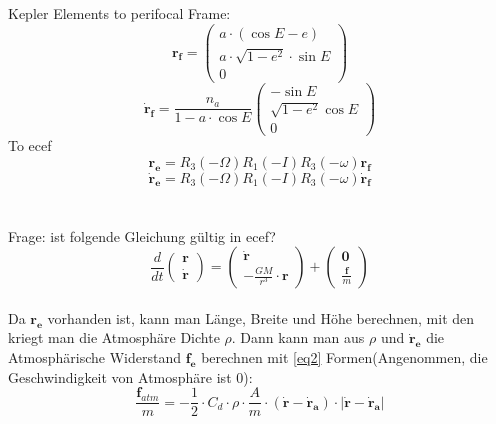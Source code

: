 \documentclass{article}
\begin{document}
\section{}
Kepler Elements to perifocal Frame: 
\begin{equation*}
	\bm{r_f} = \left(\begin{matrix}
		a \cdot \left(\cos E-e\right) \\
		a \cdot \sqrt{1-e^2} \cdot \sin E \\
		0
	\end{matrix}\right)
\end{equation*}
\begin{equation*}
	\bm{\dot{r}_f} = \frac{n_a}{1-a \cdot \cos E}\left(\begin{matrix}
		-\sin E \\
		\sqrt{1-e^2} \cos E \\
		0
	\end{matrix}\right)
\end{equation*}
To ecef
\begin{equation*}
	\bm{r_e} = R_3(-\Omega) R_1(-I) R_3(-\omega) \bm{r_f}
\end{equation*}
\begin{equation*}
	\bm{\dot{r}_e} = R_3(-\Omega) R_1(-I) R_3(-\omega) \bm{\dot{r}_f}
\end{equation*}
\\
\\
Frage: ist folgende Gleichung gültig in ecef?
\begin{equation}\label{eq1}
	\frac{d}{dt} \left(\begin{matrix}
		\bm{r} \\
		\bm{\dot{r}}
	\end{matrix}\right) = \left(\begin{matrix}
	\bm{\dot{r}} \\
	-\frac{GM}{r^3} \cdot \bm{r}
\end{matrix}\right) + \left(\begin{matrix}
\bm{0} \\
\frac{\bm{f}}{m}
\end{matrix}\right)
\end{equation}
\\
Da $\bm{r_e}$ vorhanden ist, kann man Länge, Breite und Höhe berechnen, mit den kriegt man die Atmosphäre Dichte $\rho$. Dann kann man aus $\rho$ und $\bm{\dot{r}_e}$ die Atmosphärische Widerstand $\bm{f_e}$ berechnen mit \autoref{eq2} Formen(Angenommen, die Geschwindigkeit von Atmosphäre ist 0):
\begin{equation}\label{eq2}
	\frac{\bm{f}_{atm}}{m} = -\frac{1}{2} \cdot C_d \cdot \rho \cdot \frac{A}{m} \cdot \left(\bm{\dot{r}} - \bm{\dot{r}_a}\right) \cdot |\bm{\dot{r}} - \bm{\dot{r}_a}|
\end{equation}
\end{document}
